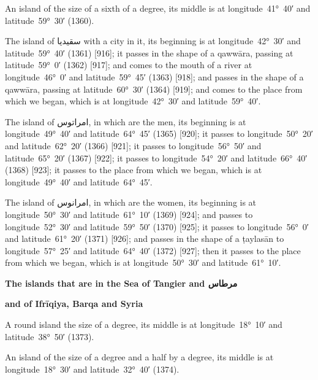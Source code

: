 \documentclass[11pt]{article}
\newcommand{\Pg}[1]{\marginpar{\footnotesize #1}}
\begin{document}
An island of the size of a sixth of a degree, its middle is at longitude~41°~40′ and latitude~59°~30′ (1360).

The island of \textarabic{سقيديا} with a city in it, its beginning is at longitude~42°~30′ and latitude~59°~40′ (1361) [916]; it passes in the shape of a qawwāra, passing at latitude~59°~0′ (1362) [917]; and comes to the mouth of a river at longitude~46°~0′ and latitude~59°~45′ (1363) [918]\Pg{p. 89}; and passes in the shape of a qawwāra, passing at latitude~60°~30′ (1364) [919]; and comes to the place from which we began, which is at longitude~42°~30′ and latitude~59°~40′.

The island of \textarabic{امراتوس}, in which are the men, its beginning is at longitude~49°~40′ and latitude~64°~45′ (1365) [920]; it passes to longitude~50°~20′ and latitude~62°~20′ (1366) [921]; it passes to longitude~56°~50′ and latitude~65°~20′ (1367) [922]; it passes to longitude~54°~20′ and latitude~66°~40′ (1368) [923]; it passes to the place from which we began, which is at longitude~49°~40′ and latitude~64°~45′.

The island of \textarabic{امرانوس}, in which are the women, its beginning is at longitude~50°~30′ and latitude~61°~10′ (1369) [924]; and passes to longitude~52°~30′ and latitude~59°~50′ (1370) [925]; it passes to longitude~56°~0′ and latitude~61°~20′ (1371) [926]; and passes in the shape of a ṭaylasān to longitude~57°~25′ and latitude~64°~40′ (1372) [927]; then it passes to the place from which we began, which is at longitude~50°~30′ and latitude~61°~10′.

\par\medskip\begin{center}\bfseries The islands that are in the Sea of Tangier and \textarabic{مرطاس}\end{center}\par

\par\medskip\begin{center}\bfseries and of Ifrīqiya, Barqa and Syria\end{center}\par

A round island the size of a degree, its middle is at longitude~18°~10′ and latitude~38°~50′ (1373).

An island of the size of a degree and a half by a degree, its middle is at longitude~18°~30′ and latitude~32°~40′ (1374).
\end{document}
